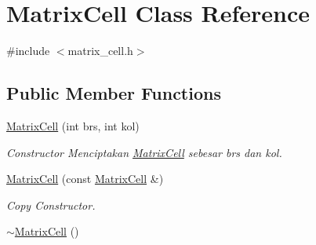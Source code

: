 \hypertarget{classMatrixCell}{\section{Matrix\-Cell Class Reference}
\label{classMatrixCell}
}


{\ttfamily \#include $<$matrix\-\_\-cell.\-h$>$}

\subsection*{Public Member Functions}
\begin{DoxyCompactItemize}
\item 
\hyperlink{classMatrixCell_aa3193302e7060271c18d5200e9b02bfd}{Matrix\-Cell} (int brs, int kol)
\begin{DoxyCompactList}\small\item\em Constructor Menciptakan \hyperlink{classMatrixCell}{Matrix\-Cell} sebesar brs dan kol. \end{DoxyCompactList}\item 
\hypertarget{classMatrixCell_acd03a072415e3c564107f745139f364b}{\hyperlink{classMatrixCell_acd03a072415e3c564107f745139f364b}{Matrix\-Cell} (const \hyperlink{classMatrixCell}{Matrix\-Cell} \&)}\label{classMatrixCell_acd03a072415e3c564107f745139f364b}

\begin{DoxyCompactList}\small\item\em Copy Constructor. \end{DoxyCompactList}\item 
\hypertarget{classMatrixCell_a6bc3fd3a444ad530d2122a21d24c1687}{\hyperlink{classMatrixCell_a6bc3fd3a444ad530d2122a21d24c1687}{$\sim$\-Matrix\-Cell} ()}\label{classMatrixCell_a6bc3fd3a444ad530d2122a21d24c1687}


\end{DoxyCompactItemize}
